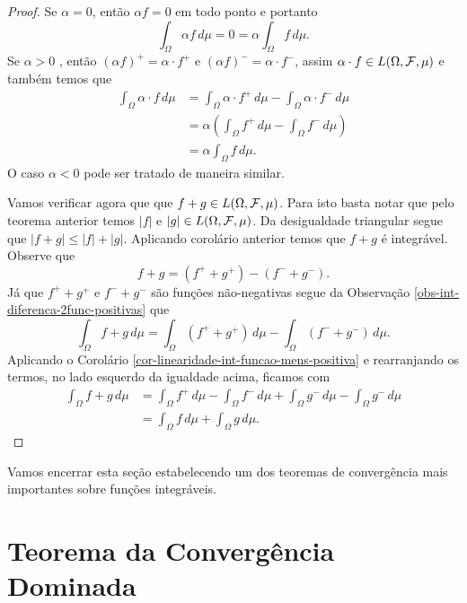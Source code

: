 \begin{proof}
Se $\alpha=0$, então $\alpha f= 0$ em todo ponto e portanto
	\[
	\int_{\Omega}\alpha f\, d\mu 
	=
	0
	= 
	\alpha\int_{\Omega} f\, d\mu.
	\]
Se $\alpha>0$ , então $(\alpha f)^{+}=\alpha\cdot f^{+}$ e 
$(\alpha f)^{-}=\alpha \cdot f^{-}$, assim 
$\alpha\cdot f\in L(\Omega,\mathcal{F},\mu)$ e também temos que 
\begin{align*}
	\int_{\Omega} \alpha\cdot f\, d\mu 
	&=
	\int_{\Omega} \alpha \cdot f^{+}\, d\mu 
	-
	\int_{\Omega} \alpha \cdot f^{-}\, d\mu 
	\\[0.3cm]
	&=
	\alpha
	\left(
	\int_{\Omega}  f^{+}\, d\mu 
	-
	\int_{\Omega}  f^{-}\, d\mu 
	\right)
	\\[0.3cm]
	&=
	\alpha \int_{\Omega} f\, d\mu.
\end{align*}
O caso $\alpha<0$ pode ser tratado de maneira similar.

Vamos verificar agora que que $f+g\in L(\Omega,\mathcal{F},\mu)$.
Para isto basta notar que pelo teorema anterior
temos $|f|$ e $|g| \in L(\Omega,\mathcal{F},\mu)$. Da desigualdade
triangular segue que $|f+g|\leq |f|+|g|$. Aplicando  
corolário anterior temos que $f+g$ é integrável. 
Observe que 
	\[
		f+g = (f^{+}+g^{+})-(f^{-}+g^{-}).
	\]
Já que $f^{+}+g^{+}$ e $f^{-}+g^{-}$ são funções não-negativas
segue da Observação \ref{obs-int-diferenca-2func-positivas}
que 
	\[
		\int_{\Omega} f+g\, d\mu 
		=
		\int_{\Omega} (f^{+}+g^{+})\, d\mu 
		-
		\int_{\Omega} (f^{-}+g^{-})\, d\mu.
	\]
Aplicando o Corolário \ref{cor-linearidade-int-funcao-mens-positiva}
e rearranjando os termos, no lado esquerdo da igualdade acima, ficamos
com
	\begin{align*}
		\int_{\Omega} f+g\, d\mu 
		&=
		\int_{\Omega} f^{+} \, d\mu 
		-
		\int_{\Omega} f^{-} \, d\mu 
		+
		\int_{\Omega} g^{-}\, d\mu 
		-
		\int_{\Omega} g^{-} \, d\mu 
		\\[0.3cm]
		&=
		\int_{\Omega} f \, d\mu 
		+
		\int_{\Omega} g \, d\mu.
	\end{align*}
\end{proof}









Vamos encerrar esta seção estabelecendo um dos 
teoremas de convergência mais importantes 
sobre funções integráveis. 

\section{Teorema da Convergência Dominada}



